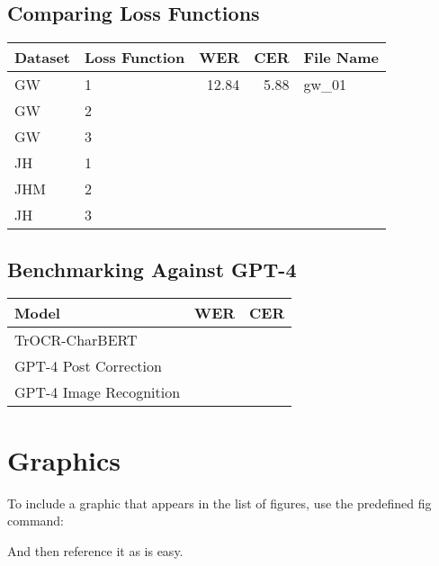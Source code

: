 \subsection{Comparing Loss Functions}
\label{subsec:5_comparing_loss_functions}
\begin{tabular}{l|l||r|r|l}
    Dataset	& Loss Function	& WER	& CER	& File Name	\\
    \hline
    \hline
    GW		& 1	            & 12.84	& 5.88  & gw\_01	\\
    GW		& 2		        &  & 	&\\
    GW		& 3	            &  & 	&\\
    \hline
    JH		& 1		        &  & 	&\\
    JHM		& 2		        &  & 	&\\
    JH		& 3		        &  & 	&\\
    \end{tabular}
\subsection{Benchmarking Against GPT-4}
\label{subsec:5_benchmarking_against_gpt-4}
\begin{tabular}{l||r|r}
    Model	& WER	& CER		\\
    \hline
    \hline
    TrOCR-CharBERT		& 	& 	\\
    GPT-4 Post Correction	&  & 	\\
    GPT-4 Image Recognition		&  & 	\\
    \end{tabular}
\section{Graphics}

To include a graphic that appears in the list of figures, use the predefined fig command:\\

And then reference it as  is easy.